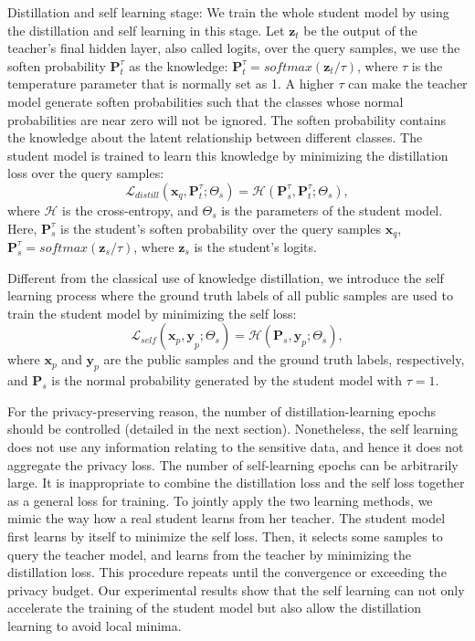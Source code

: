 \documentclass[letterpaper]{article} %
\begin{document}
Distillation and self learning stage: We train the whole student model by using the distillation and self learning in this stage. Let $\textbf{z}_t$ be the output of the teacher's final hidden layer, also called logits, over the query samples, we use the soften probability \cite{hinton2015distilling} $\textbf{P}^\tau_t$ as the knowledge: $\textbf{P}^\tau_t=softmax(\textbf{z}_t/\tau)$, where $\tau$ is the temperature parameter that is normally set as 1. A higher $\tau$ can make the teacher model generate soften probabilities such that the classes whose normal probabilities are near zero will not be ignored. The soften probability contains the knowledge about the latent relationship between different classes. The student model is trained to learn this knowledge by minimizing the distillation loss over the query samples:
\begin{equation}\label{eqn:distill-loss}
\mathcal{ L }_{ distill }({ \textbf{x} }_{ q },\textbf{P}^\tau_{ t };{ \Theta  }_{ s })=\mathcal{H}(\textbf{P}^\tau_s, \textbf{P}^\tau_{ t };{ \Theta  }_{ s }),
\end{equation}
where $\mathcal{H}$ is the cross-entropy, and $\Theta_s$ is the parameters of the student model. Here, $\textbf{P}^\tau_s$ is the student's soften probability over the query samples $\textbf{x} _{ q }$, $\textbf{P}^\tau_s = softmax(\textbf{z}_s/\tau)$, where $\textbf{z}_s$ is the student's logits.

Different from the classical use of knowledge distillation, we introduce the self learning process where the ground truth labels of all public samples are used to train the student model by minimizing the self loss:
\begin{equation}\label{eqn:self-loss}
\mathcal{ L }_{ self }({ \textbf{x} _{ p }, \textbf{y} }_{ p };{ \Theta  }_{ s })=\mathcal{H}(\textbf{P}_s, \textbf{y} _{ p };{ \Theta  }_{ s }),
\end{equation}
where $\textbf{x} _{ p }$ and $\textbf{y} _{ p }$ are the public samples and the ground truth labels, respectively, and $\textbf{P}_s$ is the normal probability generated by the student model with $\tau=1$.

For the privacy-preserving reason, the number of distillation-learning epochs should be controlled (detailed in the next section). Nonetheless, the self learning does not use any information relating to the sensitive data, and hence it does not aggregate the privacy loss. The number of self-learning epochs can be arbitrarily large. It is inappropriate to combine the distillation loss and the self loss together as a general loss for training. To jointly apply the two learning methods, we mimic the way how a real student learns from her teacher. The student model first learns by itself to minimize the self loss. Then, it selects some samples to query the teacher model, and learns from the teacher by minimizing the distillation loss. This procedure repeats until the convergence or exceeding the privacy budget. Our experimental results show that the self learning can not only accelerate the training of the student model but also allow the distillation learning to avoid local minima.
\end{document}
